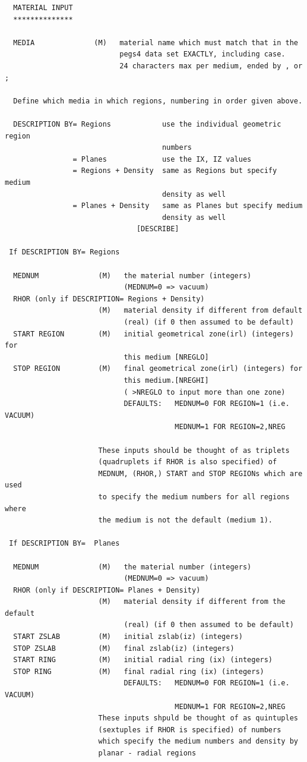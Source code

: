 \documentclass[12pt,twoside]{article}  %
\begin{document}
\begin{verbatim}
  MATERIAL INPUT
  **************

  MEDIA              (M)   material name which must match that in the
                           pegs4 data set EXACTLY, including case.
                           24 characters max per medium, ended by , or ;

  Define which media in which regions, numbering in order given above.

  DESCRIPTION BY= Regions            use the individual geometric region
                                     numbers
                = Planes             use the IX, IZ values
                = Regions + Density  same as Regions but specify medium
                                     density as well
                = Planes + Density   same as Planes but specify medium
                                     density as well
                               [DESCRIBE]

 If DESCRIPTION BY= Regions

  MEDNUM              (M)   the material number (integers)
                            (MEDNUM=0 => vacuum)
  RHOR (only if DESCRIPTION= Regions + Density)
                      (M)   material density if different from default
                            (real) (if 0 then assumed to be default)
  START REGION        (M)   initial geometrical zone(irl) (integers) for
                            this medium [NREGLO]
  STOP REGION         (M)   final geometrical zone(irl) (integers) for
                            this medium.[NREGHI]
                            ( >NREGLO to input more than one zone)
                            DEFAULTS:   MEDNUM=0 FOR REGION=1 (i.e. VACUUM)
                                        MEDNUM=1 FOR REGION=2,NREG

                      These inputs should be thought of as triplets
                      (quadruplets if RHOR is also specified) of
                      MEDNUM, (RHOR,) START and STOP REGIONs which are used
                      to specify the medium numbers for all regions where
                      the medium is not the default (medium 1).

 If DESCRIPTION BY=  Planes

  MEDNUM              (M)   the material number (integers)
                            (MEDNUM=0 => vacuum)
  RHOR (only if DESCRIPTION= Planes + Density)
                      (M)   material density if different from the default
                            (real) (if 0 then assumed to be default)
  START ZSLAB         (M)   initial zslab(iz) (integers)
  STOP ZSLAB          (M)   final zslab(iz) (integers)
  START RING          (M)   initial radial ring (ix) (integers)
  STOP RING           (M)   final radial ring (ix) (integers)
                            DEFAULTS:   MEDNUM=0 FOR REGION=1 (i.e. VACUUM)
                                        MEDNUM=1 FOR REGION=2,NREG
                      These inputs shpuld be thought of as quintuples
                      (sextuples if RHOR is specified) of numbers
                      which specify the medium numbers and density by
                      planar - radial regions
\end{verbatim}
\end{document}
